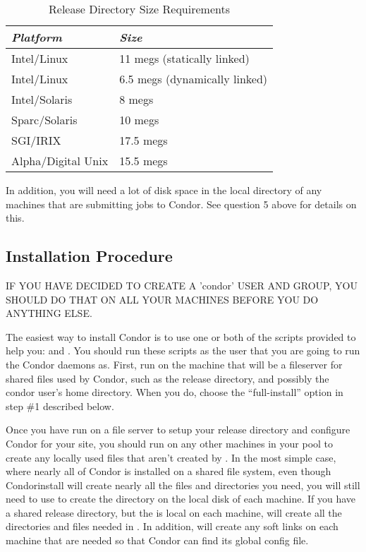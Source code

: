 \begin{center}
\begin{table}
\begin{tabular}{|ll|} \hline
\emph{Platform} 	&	\emph{Size}		\\	\hline \hline
	  Intel/Linux   &	11   megs (statically linked) \\
	  Intel/Linux   &	6.5 megs (dynamically linked) \\
	  Intel/Solaris &	8   megs \\
	  Sparc/Solaris &	10   megs \\
	  SGI/IRIX	    &	17.5 megs \\
	  Alpha/Digital Unix & 	15.5 megs \\ \hline
\end{tabular}
\caption{\label{install-sizes}Release Directory Size Requirements}
\end{table}
\end{center}

In addition, you will need a lot of disk space in the local directory
of any machines that are submitting jobs to Condor.  See question 5
above for details on this.


\subsection{Installation Procedure}
\label{install:procedure}

IF YOU HAVE DECIDED TO CREATE A 'condor' USER AND GROUP, YOU SHOULD DO
THAT ON ALL YOUR MACHINES BEFORE YOU DO ANYTHING ELSE.

The easiest way to install Condor is to use one or both of the scripts
provided to help you:  and .  You should
run these scripts as the user that you are going to run the Condor
daemons as.  First, run  on the machine that will be a
fileserver for shared files used by Condor, such as the release
directory, and possibly the condor user's home directory.  When you
do, choose the ``full-install'' option in step \#1 described below.

Once you have run  on a file server to setup your
release directory and configure Condor for your site, you should run
 on any other machines in your pool to create any locally
used files that aren't created by .  In the most
simple case, where nearly all of Condor is installed on a shared file
system, even though Condor{install} will create nearly all the files
and directories you need, you will still need to use  to
create the  directory on the local disk of each machine.
If you have a shared release directory, but the  is
local on each machine,  will create all the directories
and files needed in .  In addition, 
will create any soft links on each machine that are needed so that
Condor can find its global config file.

